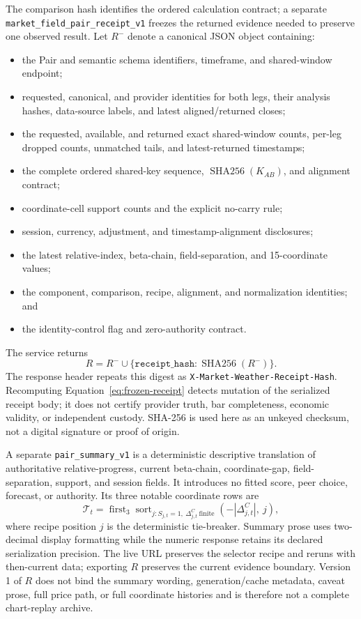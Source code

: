 \documentclass{article}
\newcommand{\sha}{\operatorname{SHA256}}
\begin{document}
The comparison hash identifies the ordered calculation contract; a separate
\texttt{market\_field\_pair\_receipt\_v1} freezes the returned evidence needed
to preserve one observed result. Let $R^{-}$ denote a canonical JSON object
containing:
\begin{itemize}
    \item the Pair and semantic schema identifiers, timeframe, and shared-window endpoint;
    \item requested, canonical, and provider identities for both legs, their analysis hashes, data-source labels, and latest aligned/returned closes;
    \item the requested, available, and returned exact shared-window counts, per-leg dropped counts, unmatched tails, and latest-returned timestamps;
    \item the complete ordered shared-key sequence, $\sha(K_{AB})$, and alignment contract;
    \item coordinate-cell support counts and the explicit no-carry rule;
    \item session, currency, adjustment, and timestamp-alignment disclosures;
    \item the latest relative-index, beta-chain, field-separation, and 15-coordinate values;
    \item the component, comparison, recipe, alignment, and normalization identities; and
    \item the identity-control flag and zero-authority contract.
\end{itemize}
The service returns
\begin{equation}
R=R^{-}\cup\{\texttt{receipt\_hash}:\sha(R^{-})\}.
\label{eq:frozen-receipt}
\end{equation}
The response header repeats this digest as
\texttt{X-Market-Weather-Receipt-Hash}. Recomputing Equation~\ref{eq:frozen-receipt}
detects mutation of the serialized receipt body; it does not certify provider
truth, bar completeness, economic validity, or independent custody. SHA-256 is
used here as an unkeyed checksum, not a digital signature or proof of origin.

A separate \texttt{pair\_summary\_v1} is a deterministic descriptive
translation of authoritative relative-progress, current beta-chain,
coordinate-gap, field-separation, support, and session fields. It introduces
no fitted score, peer choice, forecast, or authority. Its three notable
coordinate rows are
\begin{equation}
\mathcal T_t=
\operatorname{first}_3
\operatorname{sort}_{j:S_{j,t}=1,\ \Delta^C_{j,t}\ \mathrm{finite}}
\left(-|\Delta^C_{j,t}|,\ j\right),
\label{eq:summary-top-three}
\end{equation}
where recipe position $j$ is the deterministic tie-breaker. Summary prose uses
two-decimal display formatting while the numeric response retains its declared
serialization precision. The live URL preserves
the selector recipe and reruns with then-current data; exporting $R$ preserves
the current evidence boundary. Version 1 of $R$ does not bind the summary
wording, generation/cache metadata, caveat prose, full price path, or full
coordinate histories and is therefore not a complete chart-replay archive.
\end{document}
